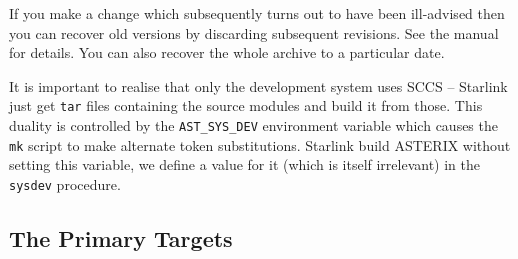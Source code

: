 If you make a change which subsequently turns out to have been ill-advised
then you can recover old versions by discarding subsequent revisions. See
the manual for details. You can also recover the whole archive to a
particular date.

It is important to realise that only the development system uses SCCS --
Starlink just get \verb+tar+ files containing the source modules and
build it from those. This duality is controlled by the \verb+AST_SYS_DEV+
environment variable which causes the \verb+mk+ script to make alternate
token substitutions. Starlink build ASTERIX without setting this variable,
we define a value for it (which is itself irrelevant)  in the \verb+sysdev+
procedure.

\subsection{The Primary Targets}

